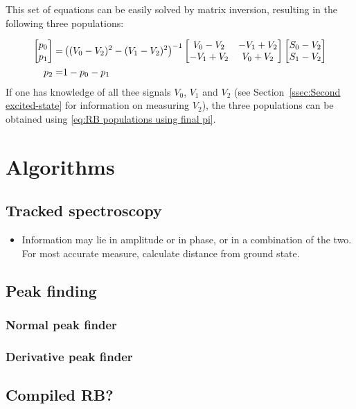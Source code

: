     This set of equations can be easily solved by matrix inversion, resulting in the following three populations:

    \begin{align}
      \begin{bmatrix}
        p_0 \\
        p_1
      \end{bmatrix}
      = &
      \left((V_0-V_2)^2 - (V_1 - V_2)^2\right)^{-1}
      \begin{bmatrix}
        V_0 - V_2 & -V_1 + V_2 \\
        -V_1 + V_2 & V_0 + V_2
      \end{bmatrix}
      \begin{bmatrix}
        S_0 - V_2 \\
        S_1 - V_2
      \end{bmatrix} \notag\\
      p_2 = & 1 - p_0 - p_1
      \label{eq:RB populations using final pi}
    \end{align}
    If one has knowledge of all thee signals $V_0$, $V_1$ and $V_2$ (see Section~\ref{ssec:Second excited-state} for information on measuring $V_2$), the three populations can be obtained using \ref{eq:RB populations using final pi}.

\chapter{Algorithms}
\section{Tracked spectroscopy}
\label{sec:Tracked spectroscopy}
  \begin{itemize}
    \item Information may lie in amplitude or in phase, or in a combination of the two. For most accurate measure, calculate distance from ground state.
  \end{itemize}
\section{Peak finding}
  \subsection{Normal peak finder}
  \subsection{Derivative peak finder}
\section{Compiled RB?}